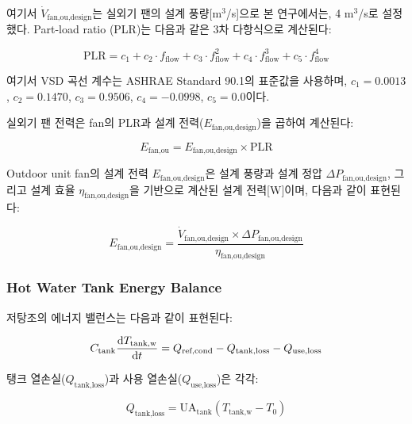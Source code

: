 \documentclass[final,5p,times,twocolumn,authoryear]{elsarticle}
\begin{document}
여기서 $\dot{V}_{\text{fan,ou,design}}$는 실외기 팬의 설계 풍량[m$^3$/s]으로 본 연구에서는, 4 m$^3$/s로 설정했다.
Part-load ratio (PLR)는 다음과 같은 3차 다항식으로 계산된다:

\begin{equation}
\label{eq:hpb_fan_plr}
\text{PLR} = c_1
+ c_2 \cdot f_{\text{flow}}
+ c_3 \cdot f_{\text{flow}}^2
+ c_4 \cdot f_{\text{flow}}^3
+ c_5 \cdot f_{\text{flow}}^4
\end{equation}

여기서 VSD 곡선 계수는 ASHRAE Standard 90.1의 표준값을 사용하며,
$c_1 = 0.0013$, $c_2 = 0.1470$, $c_3 = 0.9506$, $c_4 = -0.0998$, $c_5 = 0.0$이다.

실외기 팬 전력은 fan의 PLR과 설계 전력($E_{\text{fan,ou,design}}$)을 곱하여 계산된다:

\begin{equation}
\label{eq:hpb_e_fan}
E_{\text{fan,ou}} = E_{\text{fan,ou,design}} \times \text{PLR}
\end{equation}

Outdoor unit fan의 설계 전력 $E_{\text{fan,ou,design}}$은 설계 풍량과 설계 정압
$\Delta P_{\text{fan,ou,design}}$, 그리고 설계 효율 $\eta_{\text{fan,ou,design}}$을
기반으로 계산된 설계 전력[W]이며, 다음과 같이 표현된다:

\begin{equation}
\label{eq:hpb_fan_design_power}
E_{\text{fan,ou,design}} = \frac{\dot{V}_{\text{fan,ou,design}} \times \Delta P_{\text{fan,ou,design}}}{\eta_{\text{fan,ou,design}}}
\end{equation}

\subsubsection{Hot Water Tank Energy Balance}

저탕조의 에너지 밸런스는 다음과 같이 표현된다:

\begin{equation}
\label{eq:hpb_tank_energy}
C_{\text{tank}} \frac{{\rm d}T_{\text{tank,w}}}{{\rm d}t} = Q_{\text{ref,cond}} - Q_{\text{tank,loss}} - Q_{\text{use,loss}}
\end{equation}

탱크 열손실($Q_{\text{tank,loss}}$)과 사용 열손실($Q_{\text{use,loss}}$)은 각각:

\begin{equation}
\label{eq:hpb_q_tank_loss}
Q_{\text{tank,loss}} = \text{UA}_{\text{tank}} (T_{\text{tank,w}} - T_0)
\end{equation}
\end{document}
